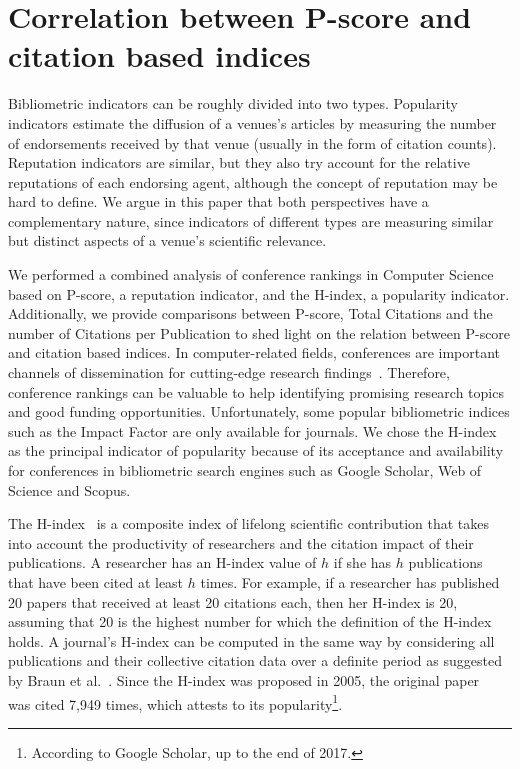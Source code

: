 \documentclass[notitlepage]{svjour3}
\begin{document}
\section{Correlation between P-score and citation based indices} 
\label{sec:correlation}

Bibliometric indicators can be roughly divided into two types. Popularity indicators 
estimate the diffusion of a venues's articles by measuring the number of
endorsements received by that venue (usually in the form of citation counts). Reputation
indicators are similar, but they also try account for the relative reputations of each
endorsing agent, although the concept of reputation may be hard to define.
We argue in this paper that both perspectives have a complementary nature,
since indicators of different types are measuring similar but distinct aspects of
a venue's scientific relevance. 

We performed a combined analysis of conference rankings in Computer Science based on 
P-score, a reputation indicator, and the H-index, a popularity indicator. Additionally, 
we provide comparisons between P-score, Total Citations and the number of Citations per 
Publication to shed light on the relation between P-score and citation based indices.
In computer-related fields, conferences are important channels of dissemination for cutting-edge
research findings~\cite{Lee2019}. Therefore, conference rankings can be valuable to help
identifying promising research topics and good funding opportunities. Unfortunately, some
popular bibliometric indices such as the Impact Factor are only available for journals.
We chose the H-index as the principal indicator of popularity because of its acceptance 
and availability for conferences in bibliometric search engines such as Google Scholar, 
Web of Science and Scopus. 

The H-index~\cite{Hirsch2005} is a composite index of lifelong scientific contribution that takes 
into account the productivity of researchers and the citation impact of their publications.
A researcher has an H-index value of $ h $ if she has $ h $ publications that have been cited at 
least $ h $ times. For example, if a researcher has published 20 papers that received at least 20 
citations each, then her H-index is 20, assuming that 20 is the highest number for which the 
definition of the H-index holds. A journal's H-index can be computed 
in the same way by considering all publications and their collective citation data over a 
definite period as suggested by Braun et al.~\cite{Braun2006}.
Since the H-index was proposed in 2005, the original paper~\cite{Hirsch2005} was 
cited 7,949 times, which attests to its popularity\footnote{According to Google Scholar, up to the end of 2017.}.
\end{document}
